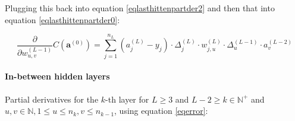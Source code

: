 \documentclass{article}
\begin{document}
          Plugging this back into equation \ref{eqlasthittenpartder2} and then
          that into equation \ref{eqlasthittenpartder0}:

          \begin{equation}
            \frac{\partial}{\partial w_{u,v}^{(L-1)}}
              C \left( \mathbf{a}^{(0)} \right)
                = \sum_{j=1}^{n_L}
                    \left( a_j^{(L)} - y_j \right)
                    \cdot
                    \Delta_j^{(L)}
                    \cdot
                    w_{j,u}^{(L)}
                    \cdot
                    \Delta_u^{(L-1)}
                    \cdot
                    a_{v}^{(L-2)}
          \end{equation}

        \paragraph{In-between hidden layers}

          Partial derivatives for the $k$-th layer for $L \geq 3$ and
          $L-2 \geq k \in \mathbb{N}^+$ and
          $u, v \in \mathbb{N}, 1 \leq u \leq n_k, v \leq n_{k - 1}$,
          using equation \ref{eqerror}:
\end{document}
